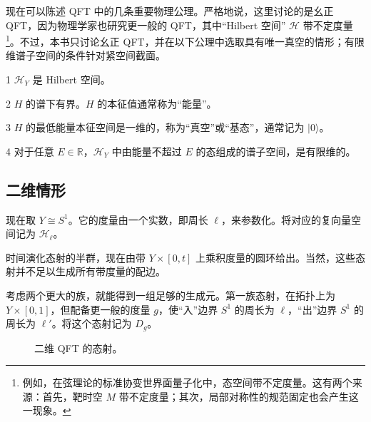 现在可以陈述 QFT 中的几条重要物理公理。严格地说，这里讨论的是幺正 QFT，因为物理学家也研究更一般的 QFT，其中“Hilbert 空间” $\mathcal{H}$ 带不定度量\footnote{例如，在弦理论的标准协变世界面量子化中，态空间带不定度量。这有两个来源：首先，靶时空 $M$ 带不定度量；其次，局部对称性的规范固定也会产生这一现象。}。不过，本书只讨论幺正 QFT，并在以下公理中选取具有唯一真空的情形；有限维谱子空间的条件针对紧空间截面。

\begin{letteraxiom}{1}\label{axiom:3.1}
$\mathcal{H}_Y$ 是 Hilbert 空间。
\end{letteraxiom}

\begin{letteraxiom}{2}\label{axiom:3.2}
$H$ 的谱下有界。$H$ 的本征值通常称为“能量”。
\end{letteraxiom}

\begin{letteraxiom}{3}\label{axiom:3.3}
$H$ 的最低能量本征空间是一维的，称为“真空”或“基态”，通常记为 $|0\rangle$\footnotemark。
\end{letteraxiom}

\begin{letteraxiom}{4}\label{axiom:3.4}
对于任意 $E\in\mathbb{R}$，$\mathcal{H}_Y$ 中由能量不超过 $E$ 的态组成的谱子空间，是有限维的。
\end{letteraxiom}

\subsection{二维情形}\label{sec:3.2.1}

现在取 $Y\cong S^1$。它的度量由一个实数，即周长 $\ell$，来参数化。将对应的复向量空间记为 $\mathcal{H}_\ell$。

时间演化态射的半群，现在由带 $Y\times[0,t]$ 上乘积度量的圆环给出。当然，这些态射并不足以生成所有带度量的配边。

考虑两个更大的族，就能得到一组足够的生成元。第一族态射，在拓扑上为 $Y\times[0,1]$，但配备更一般的度量 $g$，使“入”边界 $S^1$ 的周长为 $\ell$，“出”边界 $S^1$ 的周长为 $\ell'$。将这个态射记为 $D_g$。
\begin{figure}[H]
\centering
{}
\caption{二维 QFT 的态射。}\label{fig:3.2}
\end{figure}


